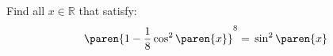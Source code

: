 Find all $x \in \mathbb{R}$ that satisfy:
\begin{equation*}
  \paren{1 - \frac{1}{8} \cos^2\paren{x}}^{8} = \, \sin^2\paren{x}
\end{equation*}
